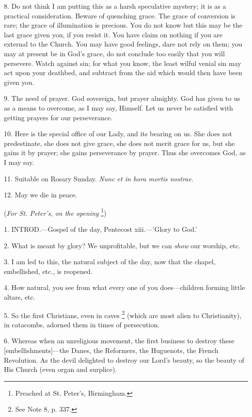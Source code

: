 8. Do not think I am putting this as a harsh
speculative mystery; it is as a practical consideration. Beware of
quenching grace. The grace of conversion is rare; the grace of
illumination is precious. You do not know but this may be the last
grace given you, if you resist it. You have claim on nothing if you
are external to the Church. You may have good feelings, dare not rely
on them; you may at present be in God's grace, do not conclude too
easily that you will persevere. Watch against sin; for what you know,
the least wilful venial sin may act upon your deathbed, and subtract
from the aid which would then have been given you.

9. The need of prayer. God sovereign, but prayer
almighty. God has given to us as a means to overcome, as I may say,
Himself. Let us never be satisfied with getting prayers for our
perseverance.

10. Here is the special office of our Lady, and
its bearing on us. She does not predestinate, she does not give
grace, she does not merit grace for us, but she gains it by prayer;
she gains perseverance by prayer. Thus she overcomes God, as I may
say.

11. Suitable on Rosary Sunday. \emph{Nunc et in hora
mortis nostrae}.

12. May we die in peace.


(\emph{For St. Peter's, on the
opening} \footnote{Preached at St. Peter's,
Birmingham.})

1. INTROD.—Gospel
of the day, Pentecost xiii.—'Glory to God.'

2. What is meant by glory? We unprofitable, but
we can \emph{show} our worship, etc.

3. I am led to this, the natural subject of the
day, now that the chapel, embellished, etc., is reopened.

4. How natural, you see from what every one of
you does—children forming little altars, etc.

5. So the first Christians, even in caves \footnote{See Note
8, p. 337.} (which are most alien to Christianity), in catacombs, adorned
them in times of persecution.

6. Whereas when an unreligious movement, the
first business to destroy these [embellishments]—the Danes, the
Reformers, the Huguenots, the French Revolution. As the devil
delighted to destroy our Lord's beauty, so the beauty of His Church
(even organ and surplice).

